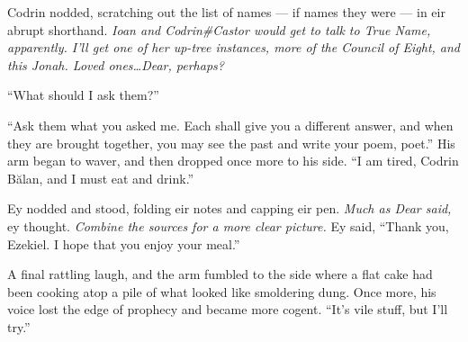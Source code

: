 Codrin nodded, scratching out the list of names — if names they were — in eir abrupt shorthand. \emph{Ioan and Codrin\#Castor would get to talk to True Name, apparently. I'll get one of her up-tree instances, more of the Council of Eight, and this Jonah. Loved ones\ldots Dear, perhaps?}

``What should I ask them?''

``Ask them what you asked me. Each shall give you a different answer, and when they are brought together, you may see the past and write your poem, poet.'' His arm began to waver, and then dropped once more to his side. ``I am tired, Codrin Bălan, and I must eat and drink.''

Ey nodded and stood, folding eir notes and capping eir pen. \emph{Much as Dear said,} ey thought. \emph{Combine the sources for a more clear picture.} Ey said, ``Thank you, Ezekiel. I hope that you enjoy your meal.''

A final rattling laugh, and the arm fumbled to the side where a flat cake had been cooking atop a pile of what looked like smoldering dung. Once more, his voice lost the edge of prophecy and became more cogent. ``It's vile stuff, but I'll try.''

